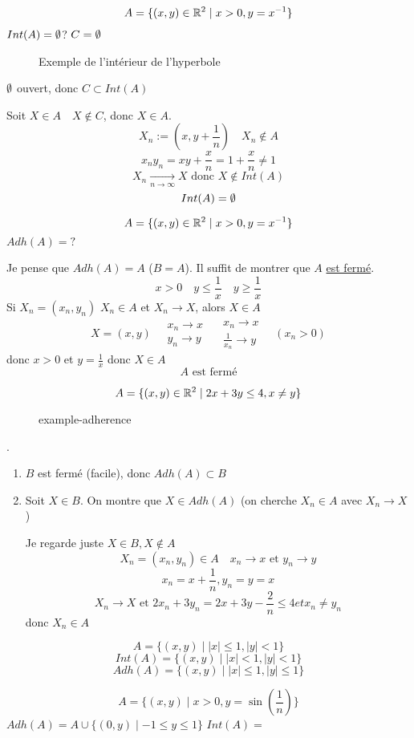 \begin{eg}
   \[
       A = \{(x, y) \in \mathbb{R}^2 \mid x > 0, y = x^{-1}\}
   \]  
   $Int(A) = \emptyset$? $C = \emptyset$
\begin{figure}[H]
    \centering
    \caption{Exemple de l'intérieur de l'hyperbole}
    \label{fig:example-interieur-hyperbola}
\end{figure}
$\emptyset$ ouvert, donc $C \subset Int(A)$
\par
Soit $X \in A \quad X \not\in C$, donc $X \in A$.
 \[
X_n := (x, y + \frac{1}{n}) \quad X_n \not\in A
\] 
\[
x_ny_n = xy + \frac{x}{n} = 1 + \frac{x}{n} \neq 1
\] 
\[
X_n \xrightarrow[n \to \infty]{} X \text{ donc } X \not\in Int(A)
\] 
\[
Int(A) = \emptyset
\] 
\end{eg}
\begin{eg}
   \[
       A = \{(x, y) \in \mathbb{R}^2 \mid x > 0, y = x^{-1}\}
   \]  
   $Adh(A) = ?$
   \par
   Je pense que  $Adh(A) = A$ ($B = A$). Il suffit de montrer que $A$ \underline{est fermé}.
    \[
   x > 0 \quad y \le \frac{1}{x} \quad y \ge \frac{1}{x}
   \] 
   Si $X_n = (x_n, y_n)$  \quad $X_n \in A$ et  $X_n \to X$, alors $X \in A$
    \[
        X = (x, y) \quad \substack{x_n \to x \\ y_n \to y} \quad \substack{x_n \to x \\ \frac{1}{x_n} \to y} \quad (x_n > 0)
   \] 
   donc $x > 0$ et  $y = \frac{1}{x}$ donc $X \in A$
    \[
   A \text{ est fermé}
   \] 
\end{eg}
\begin{eg}
   \[
       A = \{(x, y) \in \mathbb{R}^2 \mid 2x + 3y \le 4, x \neq y\}
   \]  
\begin{figure}[H]
    \centering
    \caption{example-adherence}
    \label{fig:example-adherence}
\end{figure}
.
\begin{enumerate}
    \item 
        $B$ est fermé (facile), donc  $Adh(A) \subset B$
    \item Soit $X \in B$. On montre que  $X \in Adh(A)$ (on cherche $X_n \in A$ avec  $X_n \to X$) 
        \par
        Je regarde juste $X \in B, X \not\in A$
        \[
        X_n = (x_n, y_n) \in A \quad x_n \to x \text{ et } y_n \to y
        \] 
        \[
        x_n = x + \frac{1}{n}, y_n = y = x
        \] 
        \[
        X_n \to X \text{ et } 2x_n + 3y_n = 2x + 3y - \frac{2}{n} \le 4 et x_n \neq y_n 
        \] 
        donc $X_n \in A$
\end{enumerate}
\end{eg}
\begin{eg}
   \[
       A = \{(x, y) \mid |x| \le 1, |y| < 1\}
   \]  
   \[
       Int(A) = \{(x, y) \mid |x| < 1, |y| < 1 \}
   \] 
   \[
       Adh(A) = \{(x, y) \mid |x| \le 1, |y| \le 1\}
   \] 
\end{eg}
\begin{eg}
   \[
       A = \{(x,y) \mid x > 0, y = \sin(\frac{1}{n}) \}
   \]  
   $Adh(A) = A \cup \{(0, y) \mid -1 \le y \le 1\}$
   $Int(A) = $
\end{eg}
